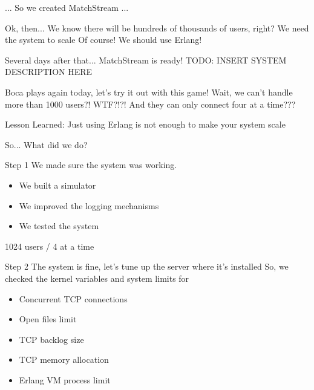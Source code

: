 \documentclass[utf8]{beamer}
\begin{document}
\begin{frame}
... So we created MatchStream ...
\end{frame}

\begin{frame}
Ok, then... We know there will be hundreds of thousands of users, right?
We need the system to \alert{scale}
\pause
Of course! We should use Erlang!
\end{frame}

\begin{frame}
Several days after that...
\pause
MatchStream is ready!
TODO: INSERT SYSTEM DESCRIPTION HERE
\end{frame}

\begin{frame}
Boca plays again today, let's try it out with this game!
\pause
Wait, we can't handle more than 1000 users?! WTF?!?!
\pause
And they can only connect four at a time???
\end{frame}

\begin{frame}
Lesson Learned: Just using Erlang is not enough to make your system scale
\end{frame}

\begin{frame}
So... What did we do?
\end{frame}

\begin{frame}{Step 1}
We made sure the system was working.
\pause
\begin{itemize}
	\item<+-> We built a simulator
	\item<+-> We improved the logging mechanisms
	\item<+-> We tested the system
\end{itemize}
\end{frame}

\begin{frame}
1024 users / 4 at a time
\end{frame}

\begin{frame}{Step 2}
The system is fine, let's tune up the server where it's installed
\pause
So, we checked the kernel variables and system limits for
\begin{itemize}
	\item<+-> Concurrent TCP connections
	\item<+-> Open files limit
	\item<+-> TCP backlog size
	\item<+-> TCP memory allocation
	\item<+-> Erlang VM process limit
\end{itemize}
\end{frame}
\end{document}
